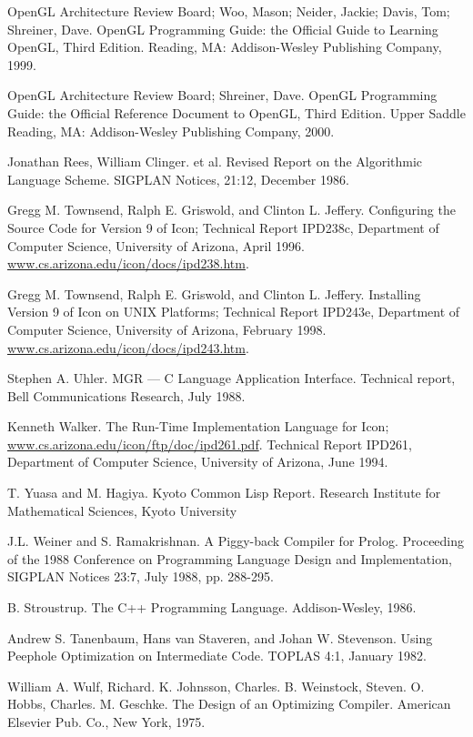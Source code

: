 \begin{noIndex}
\noindent
[OpenGL99] OpenGL Architecture Review Board; Woo, Mason; Neider,
Jackie; Davis, Tom; Shreiner, Dave. OpenGL Programming Guide: the
Official Guide to Learning OpenGL, Third Edition. Reading, MA:
Addison-Wesley Publishing Company, 1999.

\noindent
[OpenGL00] OpenGL Architecture Review Board; Shreiner, Dave. OpenGL
Programming Guide: the Official Reference Document to OpenGL, Third
Edition. Upper Saddle Reading, MA: Addison-Wesley Publishing Company,
2000.

\noindent
[Rees 86] Jonathan Rees, William Clinger. et al. Revised Report on the
Algorithmic Language Scheme. SIGPLAN Notices, 21:12, December 1986.

\noindent
[TGJ96] Gregg M. Townsend, Ralph E. Griswold, and Clinton
L. Jeffery. Configuring the Source Code for Version 9 of Icon;
Technical Report IPD238c, Department of Computer Science, University
of Arizona, April 1996.
\url{www.cs.arizona.edu/icon/docs/ipd238.htm}.

\noindent
[TGJ98] Gregg M. Townsend, Ralph E. Griswold, and Clinton
L. Jeffery. Installing Version 9 of Icon on UNIX Platforms; Technical
Report IPD243e, Department of Computer Science, University of Arizona,
February 1998.
\url{www.cs.arizona.edu/icon/docs/ipd243.htm}.

\noindent
[Uhl88] Stephen A. Uhler. MGR --- C Language Application
Interface. Technical report, Bell Communications Research, July 1988.

\noindent
[Walker94] Kenneth Walker. The Run-Time Implementation Language for Icon;
\url{www.cs.arizona.edu/icon/ftp/doc/ipd261.pdf}. Technical
Report IPD261, Department of Computer Science, University of Arizona,
June 1994.

\noindent
[Yuasa] T. Yuasa and M. Hagiya. Kyoto Common Lisp Report. Research
Institute for Mathematical Sciences, Kyoto University

\noindent
[Weiner] J.L. Weiner and S. Ramakrishnan. A Piggy-back Compiler for
Prolog. Proceeding of the 1988 Conference on Programming Language
Design and Implementation, SIGPLAN Notices 23:7, July 1988,
pp. 288-295.

\noindent
[Stroustrup 86] B. Stroustrup. The C++ Programming
Language. Addison-Wesley, 1986.

\noindent
[peephole] Andrew S. Tanenbaum, Hans van Staveren, and Johan
W. Stevenson. Using Peephole Optimization on Intermediate Code. TOPLAS
4:1, January 1982.

\noindent
[Wulf] William A. Wulf, Richard. K. Johnsson, Charles. B. Weinstock,
Steven. O. Hobbs, Charles. M. Geschke. The Design of an Optimizing
Compiler. American Elsevier Pub. Co., New York, 1975.


\end{noIndex}
